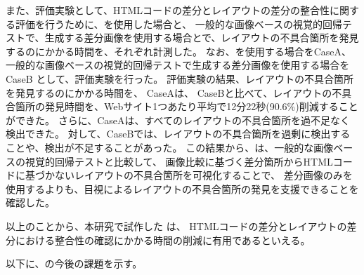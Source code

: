 \par
また、評価実験として、HTMLコードの差分とレイアウトの差分の整合性に関する評価を行うために、\toolName を使用した場合と、
一般的な画像ベースの視覚的回帰テストで、生成する差分画像を使用する場合とで、レイアウトの不具合箇所を発見するのにかかる時間を、それぞれ計測した。
なお、\toolName を使用する場合をCaseA、一般的な画像ベースの視覚的回帰テストで生成する差分画像を使用する場合をCaseB
として、評価実験を行った。
評価実験の結果、レイアウトの不具合箇所を発見するのにかかる時間を、
CaseAは、
CaseBと比べて、レイアウトの不具合箇所の発見時間を、Webサイト1つあたり平均で12分22秒(90.6\%)削減することができた。
さらに、CaseAは、すべてのレイアウトの不具合箇所を過不足なく検出できた。
対して、CaseBでは、レイアウトの不具合箇所を過剰に検出することや、検出が不足することがあった。
この結果から、\toolName は、一般的な画像ベースの視覚的回帰テストと比較して、
画像比較に基づく差分箇所からHTMLコードに基づかないレイアウトの不具合箇所を可視化することで、
差分画像のみを使用するよりも、目視によるレイアウトの不具合箇所の発見を支援できることを確認した。
\par
以上のことから、本研究で試作した \toolName は、
HTMLコードの差分とレイアウトの差分における整合性の確認にかかる時間の削減に有用であるといえる。
\par
以下に、\toolName の今後の課題を示す。
